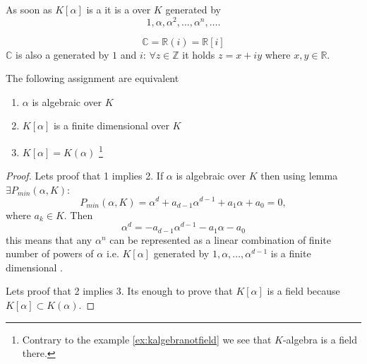 As soon as $K\left[\alpha\right]$ is a  it is a
 over $K$ generated by
\[
1, \alpha, \alpha^2, \dots,
\alpha^n, \dots.
\]

\begin{example}[$\mathbb{C}$]
  \[
  \mathbb{C} = \mathbb{R}\left(i\right) = \mathbb{R}\left[i\right]
  \]
  $\mathbb{C}$ is also a  generated by $1$
  and $i$: $\forall z \in \mathbb{Z}$ it holds $z = x + i y$ where
  $x,y \in \mathbb{R}$.
\end{example}

\begin{proposition}
  The following assignment are equivalent
  \begin{enumerate}
  \item $\alpha$ is algebraic over $K$
  \item $K\left[\alpha\right]$ is a finite dimensional
     over $K$
  \item $K\left[\alpha\right] = K\left(\alpha\right)$
    \footnote{
      Contrary to the example \ref{ex:kalgebranotfield} we see
      that $K$-algebra is a field there.
    }
  \end{enumerate}
  \begin{proof}
    Lets proof that 1 implies 2. If $\alpha$ is algebraic over $K$
    then using lemma  $\exists
    P_{min}\left(\alpha, K\right)$:
    \[
    P_{min}\left(\alpha, K\right) = \alpha^d + a_{d-1}\alpha^{d-1} +
    a_1 \alpha + a_0 = 0,
    \]
    where $a_k \in K$. Then
    \[
    \alpha^d  = - a_{d-1}\alpha^{d-1} -
    a_1 \alpha - a_0
    \]
    this means that any $\alpha^n$ can be represented as a linear
    combination of finite number of powers of $\alpha$ i.e.
    $K\left[\alpha\right]$ generated by $1, \alpha, \dots,
    \alpha^{d-1}$ is a finite dimensional .

    Lets proof that 2 implies 3. Its enough to prove that
    $K\left[\alpha\right]$ is a field because
    $K\left[\alpha\right] \subset K\left(\alpha\right)$.
    

\end{proof}
\end{proposition}
